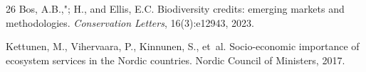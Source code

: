 \documentclass[11pt,a4paper]{article}
\begin{document}
\begin{thebibliography}{26}
Bos, A.B.,"; H., and Ellis, E.C.
\newblock Biodiversity credits: emerging markets and methodologies.
\newblock \emph{Conservation Letters}, 16(3):e12943, 2023.

Kettunen, M., Vihervaara, P., Kinnunen, S., et~al.
\newblock Socio-economic importance of ecosystem services in the Nordic countries.
\newblock Nordic Council of Ministers, 2017.

\end{thebibliography}
\end{document}
